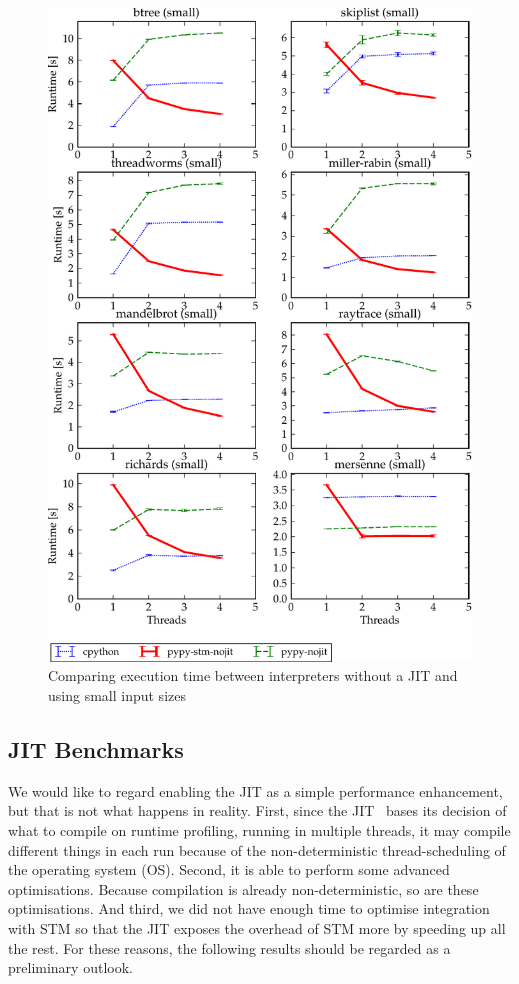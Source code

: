 \documentclass{sigplanconf}
\begin{document}
\begin{figure}[h]
  \centering
  \includegraphics[width=1\columnwidth]{plots/performance_nojit.pdf}
  \caption{Comparing execution time between interpreters without a JIT
    and using small input sizes\label{fig:performance-nojit}}
\end{figure}



\subsection{JIT Benchmarks\label{subsec:jit-benchs}}

We would like to regard enabling the JIT as a simple performance
enhancement, but that is not what happens in reality. First, since the
JIT~\cite{cfbolz09} bases its decision of what to compile on runtime
profiling, running in multiple threads, it may compile different
things in each run because of the non-deterministic thread-scheduling
of the operating system (OS). Second, it is able to perform some
advanced optimisations. Because compilation is already non-deterministic,
so are these optimisations. And third, we did
not have enough time to optimise integration with STM so that the JIT
exposes the overhead of STM more by speeding up all the rest.
For these reasons, the following results should be regarded as a
preliminary outlook.
\end{document}

